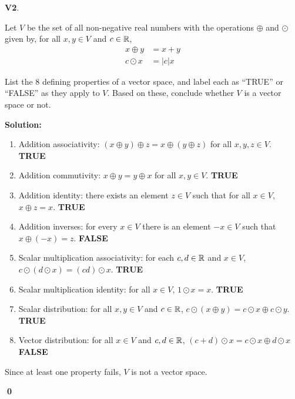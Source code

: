 \documentclass{article}
\newenvironment{problem}[1]
{
  \begin{flushleft}
  \textbf{#1}.
  \ignorespaces
}
{
  \end{flushleft}
}
\newenvironment{solution}
{
  \ignorespaces
  \textbf{Solution:}
}
{
  \ignorespacesafterend
  \begin{flushright}
  {\bfseries \qed}
  \end{flushright}
}
\begin{document}
\begin{problem}{V2}
  Let \(V\) be the set of all non-negative real numbers with the operations
  \(\oplus\) and \(\odot\) given by, for all \(x,y \in V\) and \(c \in \mathbb{R}\),
  \begin{align*}
  x \oplus y &= x+y \\
  c \odot x &= |c|x
  \end{align*}

  List the 8 defining properties of a vector space, and label each as
  ``TRUE'' or ``FALSE'' as they apply to \(V\). Based on these, conclude whether
  \(V\) is a vector space or not.
  \end{problem}
\begin{solution}
  \begin{enumerate}[1)]
    \item Addition associativity:
          \((x\oplus y)\oplus z = x\oplus (y \oplus z)\)
          for all \(x,y,z \in V\).
          \textbf{TRUE}
    \item Addition commutivity:
          \(x\oplus y = y \oplus x\)
          for all \(x,y \in V\).
          \textbf{TRUE}
    \item Addition identity:
           there exists an element \(z \in V\) such that for all \(x \in V\),
          \(x\oplus z = x\).
          \textbf{TRUE}
    \item Addition inverses:
          for every \(x \in V\) there is an element \(-x \in V\) such that
          \(x \oplus (-x) = z \).
          \textbf{FALSE}
    \item Scalar multiplication associativity:
          for each \(c,d \in \mathbb{R}\) and \(x \in V\),
          \(c\odot (d\odot x) = (cd) \odot x\).
          \textbf{TRUE}
    \item Scalar multiplication identity:
          for all \(x \in V\), \(1 \odot x = x \).
          \textbf{TRUE}
    \item Scalar distribution:
          for all \(x,y \in V\) and \(c \in \mathbb{R}\),
          \(c\odot(x\oplus y) = c\odot x \oplus c \odot y\).
          \textbf{TRUE}
    \item Vector distribution:
          for all \(x \in V\) and \(c,d \in \mathbb{R}\),
          \( (c+d)\odot x = c\odot x \oplus d \odot x \)
          \textbf{FALSE}
  \end{enumerate}
Since at least one property fails, \(V\) is not a vector space.
\end{solution}
\end{document}
